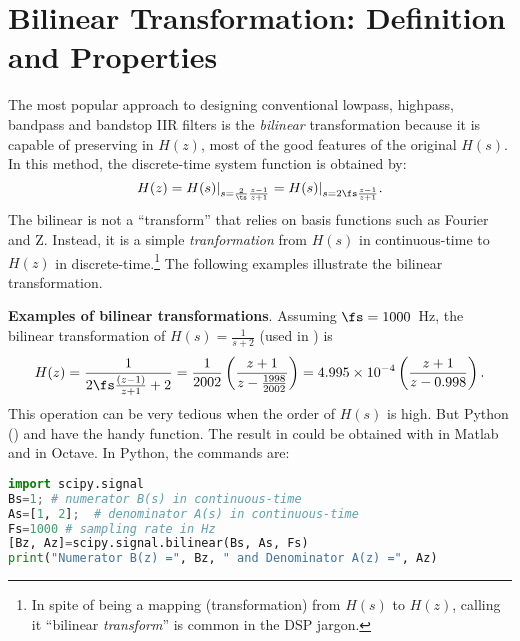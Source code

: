 \section{Bilinear Transformation: Definition and Properties}
\label{sec:bilinear_def_properties}

The most popular approach to designing conventional lowpass, highpass, bandpass and bandstop IIR filters is the \emph{bilinear} transformation because it is capable of preserving in $H(z)$, most of the good features of the original $H(s)$. In this method, the discrete-time system function is obtained by:
\begin{equation}
H(z) = H(s)|_{s=\frac{2}{\ts} \frac{z-1}{z+1} } = H(s)|_{s=2 \fs \frac{z-1}{z+1} }.
\label{eq:bilinearTransform}
\end{equation}
The bilinear is not a ``transform'' that relies on basis functions such as Fourier and Z. Instead, it
is a simple \emph{tranformation} from $H(s)$ in continuous-time to $H(z)$ in discrete-time.\footnote{In spite of 
being a mapping (transformation) from $H(s)$ to $H(z)$, 
calling it ``bilinear \emph{transform}'' is common in the DSP jargon.}
The following examples illustrate the bilinear transformation.

\bExample \textbf{Examples of bilinear transformations}.
\label{ex:bilinearExamples}
Assuming $\fs = 1000$~Hz, the bilinear transformation of $H(s) = \frac{1}{s + 2}$ (used in ) is 
\begin{equation}
H(z) = \frac{1}{2\fs \frac{(z-1)}{z+1} + 2} = \frac{1}{2002} \left( \frac{z+1}{z-\frac{1998}{2002}} \right) = 4.995\times 10^{-4} \left( \frac{z+1}{z-0.998} \right).
\label{eq:bilinear_simples_example}
\end{equation}
This operation can be very tedious when the order of $H(s)$ is high. But Python () and {\matlab} have the handy  function. The result in  could be obtained with  in Matlab and  in Octave. In Python, the commands are:
\begin{lstlisting}[language=Python]
import scipy.signal
Bs=1; # numerator B(s) in continuous-time
As=[1, 2];  # denominator A(s) in continuous-time
Fs=1000 # sampling rate in Hz
[Bz, Az]=scipy.signal.bilinear(Bs, As, Fs)
print("Numerator B(z) =", Bz, " and Denominator A(z) =", Az)
\end{lstlisting}

